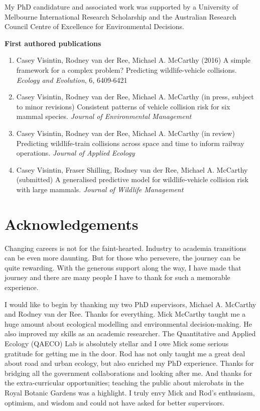\documentclass[titlesmallcaps,copyrightpage,examinerscopy]{uomthesis}
\begin{document}
My PhD candidature and associated work was supported by a University of Melbourne International Research Scholarship and the Australian Research Council Centre of Excellence for Environmental Decisions.

\newpage
\textbf{First authored publications}
\begin{enumerate}
\item Casey Visintin, Rodney van der Ree, Michael A. McCarthy (2016) A simple framework for a complex problem?  Predicting wildlife-vehicle collisions. \textit{Ecology and Evolution}, 6, 6409-6421

\item Casey Visintin, Rodney van der Ree, Michael A. McCarthy (in press, subject to minor revisions) Consistent patterns of vehicle collision risk for six mammal species. \textit{Journal of Environmental Management}

\item Casey Visintin, Rodney van der Ree, Michael A. McCarthy (in review) Predicting wildlife-train collisions across space and time to inform railway operations. \textit{Journal of Applied Ecology}

\item Casey Visintin, Fraser Shilling, Rodney van der Ree, Michael A. McCarthy (submitted) A generalised predictive model for wildlife-vehicle collision risk with large mammals. \textit{Journal of Wildlife Management}
\end{enumerate}
\clearpage{\pagestyle{empty}\cleardoublepage}

\chapter{Acknowledgements}

Changing careers is not for the faint-hearted. Industry to academia transitions can be even more daunting. But for those who persevere, the journey can be quite rewarding. With the generous support along the way, I have made that journey and there are many people I have to thank for such a memorable experience.

I would like to begin by thanking my two PhD supervisors, Michael A. McCarthy and Rodney van der Ree. Thanks for everything. Mick McCarthy taught me a huge amount about ecological modelling and environmental decision-making. He also improved my skills as an academic researcher. The Quantitative and Applied Ecology (QAECO) Lab is absolutely stellar and I owe Mick some serious gratitude for getting me in the door.  Rod has not only taught me a great deal about road and urban ecology, but also enriched my PhD experience. Thanks for bridging all the government collaborations and looking after me. And thanks for the extra-curricular opportunities; teaching the public about microbats in the Royal Botanic Gardens was a highlight. I truly envy Mick and Rod's enthusiasm, optimism, and wisdom and could not have asked for better supervisors.
\end{document}
